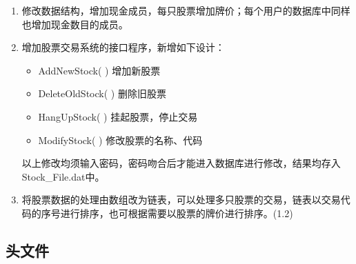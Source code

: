 \begin{enumerate}[label={（\arabic*）}]
\item 修改数据结构，增加现金成员，每只股票增加牌价；每个用户的数据库中同样也增加现金数目的成员。 
\item 增加股票交易系统的接口程序，新增如下设计： 
\begin{itemize}[label={}]
\item AddNewStock( )   增加新股票
\item DeleteOldStock( )  删除旧股票
\item HangUpStock( )   挂起股票，停止交易
\item ModifyStock( )    修改股票的名称、代码
\end{itemize}
以上修改均须输入密码，密码吻合后才能进入数据库进行修改，结果均存入Stock\_File.dat中。
\item 将股票数据的处理由数组改为链表，可以处理多只股票的交易，链表以交易代码的序号进行排序，也可根据需要以股票的牌价进行排序。(1.2)
\end{enumerate}


\subsection{头文件}

\linespread{1}











%

